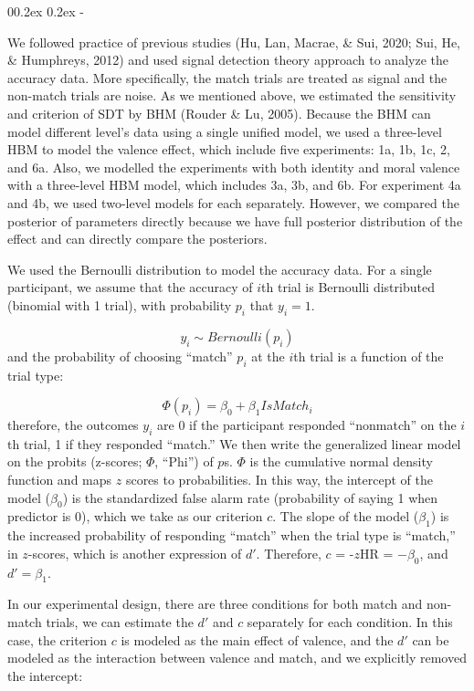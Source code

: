 \documentclass[
  english,
  man]{apa6}
\makeatletter
\let\oldsubparagraph\subparagraph
\renewcommand{\subparagraph}[1]{\oldsubparagraph{#1}\mbox{}}
\renewcommand{\subparagraph}[1]{\@startsection{subparagraph}{5}{1em}%
  {0\baselineskip \@plus 0.2ex \@minus 0.2ex}%
  {-\z@\relax}%
  {\normalfont\normalsize\itshape\hspace{\parindent}{#1}\textit{\addperi}}{\relax}}
\makeatother
\begin{document}
\hypertarget{accuracy}{%
\subparagraph{Accuracy}\label{accuracy}}

We followed practice of previous studies (Hu, Lan, Macrae, \& Sui, 2020; Sui, He, \& Humphreys, 2012) and used signal detection theory approach to analyze the accuracy data. More specifically, the match trials are treated as signal and the non-match trials are noise. As we mentioned above, we estimated the sensitivity and criterion of SDT by BHM (Rouder \& Lu, 2005). Because the BHM can model different level's data using a single unified model, we used a three-level HBM to model the valence effect, which include five experiments: 1a, 1b, 1c, 2, and 6a. Also, we modelled the experiments with both identity and moral valence with a three-level HBM model, which includes 3a, 3b, and 6b. For experiment 4a and 4b, we used two-level models for each separately. However, we compared the posterior of parameters directly because we have full posterior distribution of the effect and can directly compare the posteriors.

We used the Bernoulli distribution to model the accuracy data. For a single participant, we assume that the accuracy of \(i\)th trial is Bernoulli distributed (binomial with 1 trial), with probability \(p_{i}\) that \(y_{i} = 1\).

\[ y_{i} \sim Bernoulli(p_{i})\]
and the probability of choosing ``match'' \(p_{i}\) at the \(i\)th trial is a function of the trial type:

\[ \Phi(p_{i}) =  \beta_{0} + \beta_{1}IsMatch_{i}\]
therefore, the outcomes \(y_{i}\) are 0 if the participant responded ``nonmatch'' on the \(i\)th trial, 1 if they responded ``match.'' We then write the generalized linear model on the probits (z-scores; \(\Phi\), ``Phi'') of \(p\)s. \(\Phi\) is the cumulative normal density function and maps \(z\) scores to probabilities. In this way, the intercept of the model (\(\beta_0\)) is the standardized false alarm rate (probability of saying 1 when predictor is 0), which we take as our criterion \(c\). The slope of the model (\(\beta_1\)) is the increased probability of responding ``match'' when the trial type is ``match,'' in \(z\)-scores, which is another expression of \(d'\). Therefore, \(c\) = -\(z\)HR = \(-\beta_0\), and \(d' = \beta_1\).

In our experimental design, there are three conditions for both match and non-match trials, we can estimate the \(d'\) and \(c\) separately for each condition. In this case, the criterion \(c\) is modeled as the main effect of valence, and the \(d'\) can be modeled as the interaction between valence and match, and we explicitly removed the intercept:
\end{document}
